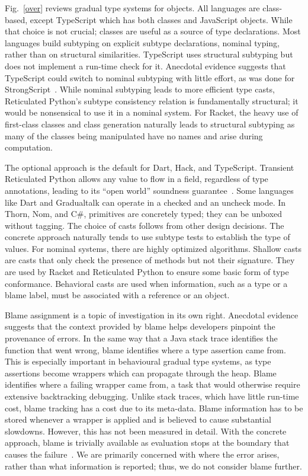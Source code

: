\documentclass[a4paper,UKenglish]{lipics-v2018}
\newcommand{\figref}[1]{Fig.~\ref{#1}\xspace}
\newcounter{lem}
\begin{document}
\figref{over} reviews gradual type systems for objects. All languages are
class-based, except TypeScript which has both classes and JavaScript
objects. While that choice is not crucial; classes are useful as a source of
type declarations. Most languages build subtyping on explicit subtype
declarations, nominal typing, rather than on structural similarities.
TypeScript uses structural subtyping but does not implement a run-time
check for it. Anecdotal evidence suggests that TypeScript could switch
to nominal subtyping with little effort, as was done for
StrongScript~\cite{ecoop15}. While nominal subtyping leads to more
efficient type casts, Reticulated Python's subtype consistency relation is
fundamentally structural; it would be nonsensical to use it in a nominal
system. For Racket, the heavy use of first-class classes and class
generation naturally leads to structural subtyping as many of the classes
being manipulated have no names and arise during computation.

The optional approach is the default for Dart, Hack, and TypeScript.
Transient Reticulated Python allows any value to flow in a field, regardless
of type annotations, leading to its ``open world'' soundness
guarantee~\cite{siek14}. Some languages like Dart and Gradualtalk can
operate in a checked and an uncheck mode. In Thorn, Nom, and C\#, primitives
are concretely typed; they can be unboxed without tagging. The choice of
casts follows from other design decisions. The concrete approach naturally
tends to use subtype tests to establish the type of values. For nominal
systems, there are highly optimized algorithms. Shallow casts are casts that
only check the presence of methods but not their signature. They are used
by Racket and Reticulated Python to ensure some basic form of type
conformance. Behavioral casts are used when information, such as a type or a
blame label, must be associated with a reference or an object.

Blame assignment is a topic of investigation in its own right. Anecdotal
evidence suggests that the context provided by blame helps developers
pinpoint the provenance of errors. In the same way that a Java stack trace
identifies the function that went wrong, blame identifies where a type
assertion came from. This is especially important in behavioural gradual
type systems, as type assertions become wrappers which can propagate through
the heap. Blame identifies where a failing wrapper came from, a task that
would otherwise require extensive backtracking debugging. Unlike stack
traces, which have little run-time cost, blame tracking has a cost due to
its meta-data. Blame information has to be stored whenever a wrapper is
applied and is believed to cause substantial slowdowns. However, this has
not been measured in detail. With the concrete approach, blame is trivially
available as evaluation stops at the boundary that causes the
failure~\cite{Muehlboeck2017}. We are primarily concerned with where the
error arises, rather than what information is reported; thus, we
do not consider blame further.
\end{document}
